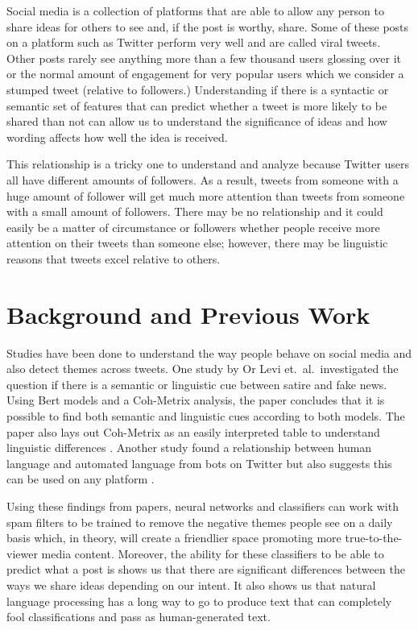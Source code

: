 \documentclass{article}
\begin{document}
Social media is a collection of platforms that are able to allow any person to share ideas for others to see and, if the post is worthy, share. 
Some of these posts on a platform such as Twitter perform very well and are called viral tweets. Other posts rarely see anything more than a few thousand users glossing over it or the normal amount of engagement for very popular users which we consider a stumped tweet (relative to followers.) 
Understanding if there is a syntactic or semantic set of features that can predict whether a tweet is more likely to be shared than not can allow us to understand the significance of ideas and how wording affects how well the idea is received. 

This relationship is a tricky one to understand and analyze because Twitter users all have different amounts of followers. 
As a result, tweets from someone with a huge amount of follower will get much more attention than tweets from someone with a small amount of followers. 
There may be no relationship and it could easily be a matter of circumstance or followers whether people 
receive more attention on their tweets than someone else; however, there may be linguistic reasons that tweets excel relative to others. 


\section{Background and Previous Work}
\label{sec:background}

Studies have been done to understand the way people behave on social media and also detect themes across tweets. 
One study by Or Levi et.\ al.\ investigated the question if there is a semantic or linguistic cue between satire and fake news. 
Using Bert models and a Coh-Metrix analysis, the paper concludes that it is possible to find both semantic and linguistic cues according to both models. The 
paper also lays out Coh-Metrix as an easily interpreted table to understand linguistic differences \cite{levi}.
Another study found a relationship between human language and automated language from bots on Twitter but also suggests this can be used on any platform \cite{CLARK20161}.

Using these findings from papers, neural networks and classifiers can work with spam filters to be trained to remove the negative themes people see on a daily basis which,
in theory, will create a friendlier space promoting more true-to-the-viewer media content. 
Moreover, the ability for these classifiers to be able to predict what a post is shows us that there are significant differences between the ways we share ideas 
depending on our intent. It also shows us that natural language processing has a long way to go to produce text that can completely fool classifications and 
pass as human-generated text.
\end{document}
